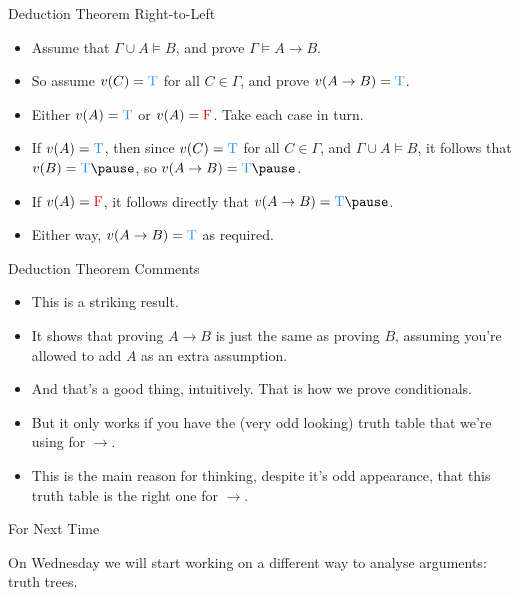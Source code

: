 \documentclass[
  ignorenonframetext,
]{beamer}
\providecommand{\tightlist}{%
  \setlength{\itemsep}{0pt}\setlength{\parskip}{0pt}}
\renewcommand{\,}{\text{, }}
\def\True{\textcolor{dodgerblue}{\text{T}}}
\def\False{\textcolor{red}{\text{F}}}
\begin{document}
\begin{frame}{Deduction Theorem Right-to-Left}
\protect\hypertarget{deduction-theorem-right-to-left}{}

\begin{itemize}
\tightlist
\item
  Assume that \(\Gamma \cup A \vDash B\), and prove
  \(\Gamma \vDash A \rightarrow B\).
\item
  So assume \(v(C) = \True\) for all \(C \in \Gamma\), and prove
  \(v(A \rightarrow B) = \True\). \pause
\item
  Either \(v(A) = \True\) or \(v(A) = \False\). Take each case in
  turn.\pause
\item
  If \(v(A) = \True\), then since \(v(C) = \True\) for all
  \(C \in \Gamma\), and \(\Gamma \cup A \vDash B\), it follows that
  \(v(B) = \True \pause\), so \(v(A \rightarrow B) = \True \pause\).
\item
  If \(v(A) = \False\), it follows directly that
  \(v(A \rightarrow B) = \True \pause\).
\item
  Either way, \(v(A \rightarrow B) = \True\) as required.
\end{itemize}

\end{frame}

\begin{frame}{Deduction Theorem Comments}
\protect\hypertarget{deduction-theorem-comments}{}

\begin{itemize}
\tightlist
\item
  This is a striking result.
\item
  It shows that proving \(A \rightarrow B\) is just the same as proving
  \(B\), assuming you're allowed to add \(A\) as an extra assumption.
\item
  And that's a good thing, intuitively. That is how we prove
  conditionals.
\item
  But it only works if you have the (very odd looking) truth table that
  we're using for \(\rightarrow\).
\item
  This is the main reason for thinking, despite it's odd appearance,
  that this truth table is the right one for \(\rightarrow\).
\end{itemize}

\end{frame}

\begin{frame}{For Next Time}
\protect\hypertarget{for-next-time}{}

On Wednesday we will start working on a different way to analyse
arguments: truth trees.

\end{frame}
\end{document}
